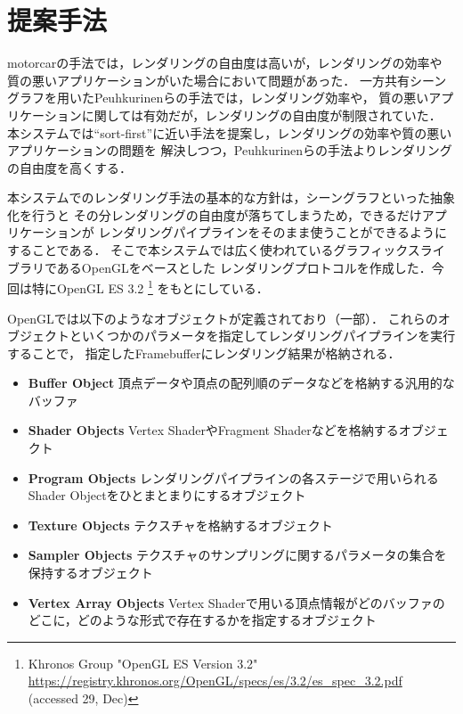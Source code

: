 \section{提案手法}

motorcarの手法では，レンダリングの自由度は高いが，レンダリングの効率や
質の悪いアプリケーションがいた場合において問題があった．
一方共有シーングラフを用いたPeuhkurinenらの手法では，レンダリング効率や，
質の悪いアプリケーションに関しては有効だが，レンダリングの自由度が制限されていた．
本システムでは``sort-first''に近い手法を提案し，レンダリングの効率や質の悪いアプリケーションの問題を
解決しつつ，Peuhkurinenらの手法よりレンダリングの自由度を高くする．

本システムでのレンダリング手法の基本的な方針は，シーングラフといった抽象化を行うと
その分レンダリングの自由度が落ちてしまうため，できるだけアプリケーションが
レンダリングパイプラインをそのまま使うことができるようにすることである．
そこで本システムでは広く使われているグラフィックスライブラリであるOpenGLをベースとした
レンダリングプロトコルを作成した．今回は特にOpenGL ES 3.2
\footnote{Khronos Group "OpenGL ES Version 3.2" \url{https://registry.khronos.org/OpenGL/specs/es/3.2/es_spec_3.2.pdf} (accessed 29, Dec)}
をもとにしている．

OpenGLでは以下のようなオブジェクトが定義されており（一部）．
これらのオブジェクトといくつかのパラメータを指定してレンダリングパイプラインを実行することで，
指定したFramebufferにレンダリング結果が格納される．
\begin{itemize}
  \item \textbf{Buffer Object} 頂点データや頂点の配列順のデータなどを格納する汎用的なバッファ
  \item \textbf{Shader Objects} Vertex ShaderやFragment Shaderなどを格納するオブジェクト
  \item \textbf{Program Objects} レンダリングパイプラインの各ステージで用いられるShader Objectをひとまとまりにするオブジェクト
  \item \textbf{Texture Objects} テクスチャを格納するオブジェクト
  \item \textbf{Sampler Objects} テクスチャのサンプリングに関するパラメータの集合を保持するオブジェクト
  \item \textbf{Vertex Array Objects}
        Vertex Shaderで用いる頂点情報がどのバッファのどこに，どのような形式で存在するかを指定するオブジェクト
\end{itemize}


